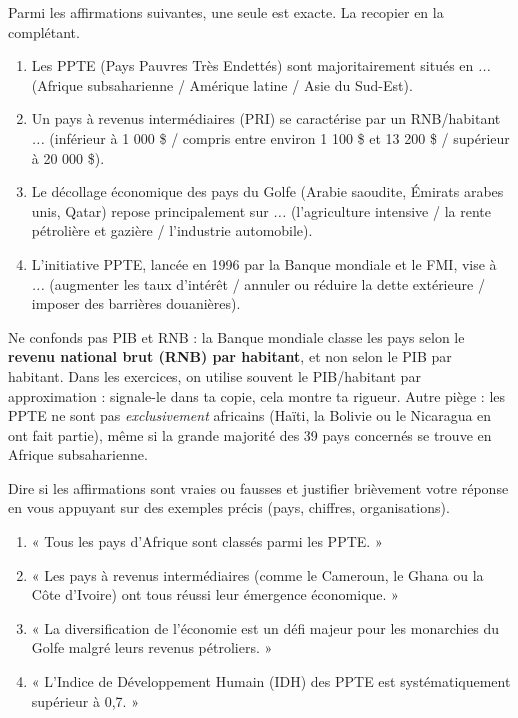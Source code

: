 \documentclass[11pt]{article}
\newcommand{\cle}[1]{{\popxbold\color{popdark}#1}}
\begin{document}
\begin{exercice}
Parmi les affirmations suivantes, une seule est exacte. La recopier en la complétant.
\begin{enumerate}
\item Les PPTE (Pays Pauvres Très Endettés) sont majoritairement situés en \emph{...} (Afrique subsaharienne / Amérique latine / Asie du Sud-Est).
\item Un pays à revenus intermédiaires (PRI) se caractérise par un RNB/habitant \emph{...} (inférieur à 1 000 \$ / compris entre environ 1 100 \$ et 13 200 \$ / supérieur à 20 000 \$).
\item Le décollage économique des pays du Golfe (Arabie saoudite, Émirats arabes unis, Qatar) repose principalement sur \emph{...} (l'agriculture intensive / la rente pétrolière et gazière / l'industrie automobile).
\item L'initiative PPTE, lancée en 1996 par la Banque mondiale et le FMI, vise à \emph{...} (augmenter les taux d'intérêt / annuler ou réduire la dette extérieure / imposer des barrières douanières).
\end{enumerate}
\end{exercice}

\begin{attention}
Ne confonds pas \cle{PIB} et \cle{RNB} : la Banque mondiale classe les pays selon le \textbf{revenu national brut (RNB) par habitant}, et non selon le PIB par habitant. Dans les exercices, on utilise souvent le PIB/habitant par approximation : signale-le dans ta copie, cela montre ta rigueur. Autre piège : les PPTE ne sont pas \emph{exclusivement} africains (Haïti, la Bolivie ou le Nicaragua en ont fait partie), même si la grande majorité des 39 pays concernés se trouve en Afrique subsaharienne.
\end{attention}

\begin{exercice}
Dire si les affirmations sont vraies ou fausses et justifier brièvement votre réponse en vous appuyant sur des exemples précis (pays, chiffres, organisations).
\begin{enumerate}
\item « Tous les pays d'Afrique sont classés parmi les PPTE. »
\item « Les pays à revenus intermédiaires (comme le Cameroun, le Ghana ou la Côte d'Ivoire) ont tous réussi leur émergence économique. »
\item « La diversification de l'économie est un défi majeur pour les monarchies du Golfe malgré leurs revenus pétroliers. »
\item « L'Indice de Développement Humain (IDH) des PPTE est systématiquement supérieur à 0,7. »
\end{enumerate}
\end{exercice}
\end{document}
